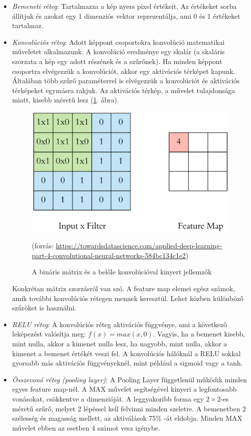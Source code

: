 \begin{itemize}
\item \textit{Bemeneti réteg}: Tartalmazza a kép nyers pixel értékeit. Az értékeket sorba állítjuk és azokat egy 1 dimenziós vektor reprezentálja, ami 0 és 1 értékeket tartalmaz.

\item \textit{Konvolúciós réteg}: Adott képpont csoportokra konvolúció matematikai műveletet alkalmazunk. A konvolúció eredménye egy skalár (a skaláris szorzata a kép egy adott részének és a szűrőnek). Ha minden képpont csoportra elvégezzük a konvolúciót, akkor egy aktivációs térképet kapunk. Általában több szűrő paraméterrel is elvégezzük a konvolúciót és aktivációs térképeket egymásra rakjuk. Az aktivációs térkép, a művelet tulajdonsága miatt, kisebb
méretű lesz (\ref{fig:convolution}. ábra).

\begin{figure}[h]
\centering
\includegraphics[scale=0.3]{images/convolution}
\caption{A bináris mátrix és a belőle konvolúcióval kinyert jellemzők}
(forrás: \url{https://towardsdatascience.com/applied-deep-learning-part-4-convolutional-neural-networks-584bc134c1e2})
\label{fig:convolution}
\end{figure}

Konkrétan mátrix szorzásról van szó. A feature map elemei egész számok, amik további konvolúciós rétegen mennek keresztül. Lehet közben különböző szűröket is használni.

\item \textit{RELU réteg}: A konvolúciós réteg aktivációs függvénye, ami a következő leképezést valósítja meg: $f(x) = max(x, 0)$. Vagyis, ha a bemenet kisebb, mint nulla, akkor a kimenet nulla lesz, ha nagyobb, mint nulla, akkor a kimenet a bemenet értékét veszi fel. A konvolúciós hálóknál a RELU sokkal gyorsabb más aktivációs függvényeknél, mint például a sigmoid vagy a tanh.
\item \textit{Összevonó réteg (pooling layer)}: A Pooling Layer függetlenül működik minden egyes feature map-nél. A MAX művelet segítségével kinyeri a legfontosabb vonásokat, csökkentve a dimenzióját. A leggyakoribb forma egy $2 \times 2$-es méretű szűrő, melyet 2 lépéssel kell felvinni minden szeletre. A bemenetben 2 szélesség és magasság mellett, az aktiválások 75\% -át eldobja. Minden MAX művelet ebben az esetben 4 számot vesz igénybe.


\end{itemize}
